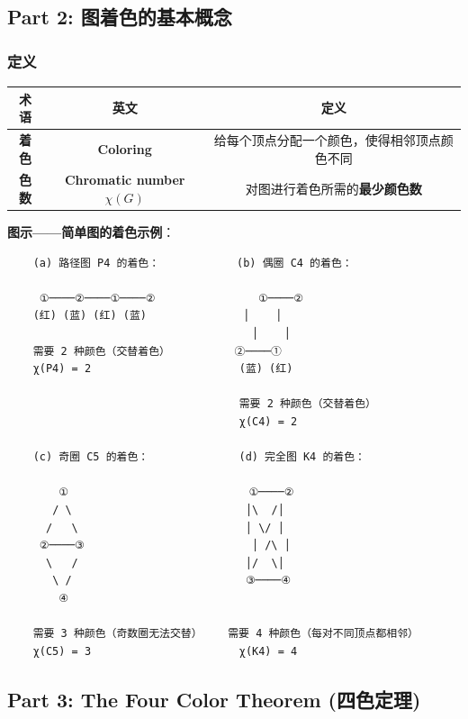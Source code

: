 \documentclass[10pt,a4paper,openany]{ctexbook}
\theoremstyle{definition}
\theoremstyle{remark}
\begin{document}
\subsection{Part 2: 图着色的基本概念}

\subsubsection{定义}

\begin{center}
\begin{tabular}{ccc}
\hline
术语 & 英文 & 定义 \\ \hline
\textbf{着色} & \textbf{Coloring} & 给每个顶点分配一个颜色，使得相邻顶点颜色不同 \\
\textbf{色数} & \textbf{Chromatic number} $\chi(G)$ & 对图进行着色所需的\textbf{最少颜色数} \\
\hline
\end{tabular}

\end{center}

\textbf{图示——简单图的着色示例}：
{\footnotesize\begin{verbatim}
    (a) 路径图 P4 的着色：            (b) 偶圈 C4 的着色：
    
     ①────②────①────②                ①────②
    (红) (蓝) (红) (蓝)               │    │
                                      │    │
    需要 2 种颜色（交替着色）          ②────①
    χ(P4) = 2                       (蓝) (红)
    
                                    需要 2 种颜色（交替着色）
                                    χ(C4) = 2
    
    (c) 奇圈 C5 的着色：              (d) 完全图 K4 的着色：
    
        ①                            ①────②
       / \                           │\  /│
      /   \                          │ \/ │
     ②────③                          │ /\ │
      \   /                          │/  \│
       \ /                           ③────④
        ④
    
    需要 3 种颜色（奇数圈无法交替）    需要 4 种颜色（每对不同顶点都相邻）
    χ(C5) = 3                       χ(K4) = 4
\end{verbatim}}

\vspace{-2pt}

\subsection{Part 3: The Four Color Theorem (四色定理)}
\end{document}

